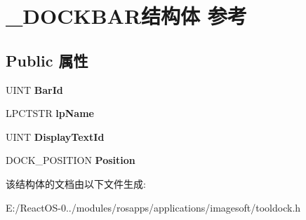 \hypertarget{struct___d_o_c_k_b_a_r}{}\section{\+\_\+\+D\+O\+C\+K\+B\+A\+R结构体 参考}
\label{struct___d_o_c_k_b_a_r}
\subsection*{Public 属性}
\begin{DoxyCompactItemize}
\item 
\mbox{\label{struct___d_o_c_k_b_a_r_a90536fd291b9b0b6eb59bc3a8f0f754b}} 
U\+I\+NT {\bfseries Bar\+Id}
\item 
\mbox{\label{struct___d_o_c_k_b_a_r_a151e1d972f3e1d0f93e04170a4fbee26}} 
L\+P\+C\+T\+S\+TR {\bfseries lp\+Name}
\item 
\mbox{\label{struct___d_o_c_k_b_a_r_aac4792f1cb5a0ecc3ff1d88a52561baf}} 
U\+I\+NT {\bfseries Display\+Text\+Id}
\item 
\mbox{\label{struct___d_o_c_k_b_a_r_af15638e81d34c62cf18340621a80e6f2}} 
D\+O\+C\+K\+\_\+\+P\+O\+S\+I\+T\+I\+ON {\bfseries Position}
\end{DoxyCompactItemize}


该结构体的文档由以下文件生成\+:\begin{DoxyCompactItemize}
\item 
E\+:/\+React\+O\+S-\/0../modules/rosapps/applications/imagesoft/tooldock.\+h\end{DoxyCompactItemize}
